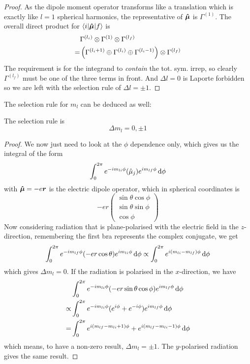 \begin{proof}
	As the dipole moment operator transforms like a translation which is exactly like $l=1$ spherical harmonics, the representative of $\boldsymbol{\hat{\mu}}$ is $\Gamma^{(1)} $. The overall direct product for $\langle i | \boldsymbol{\hat{\mu}}|f \rangle $ is 
	\begin{equation}
	\begin{aligned}
		&\Gamma^{(l_i)}\otimes\Gamma^{(1)}\otimes\Gamma^{(l_f)}\\
		=&\left(\Gamma^{(l_i+1)}\oplus\Gamma^{(l_i)}\oplus\Gamma^{(l_i-1)} \right)\otimes\Gamma^{(l_f)}
	\end{aligned}
	\end{equation}
	The requirement is for the integrand to \emph{contain} the tot. sym. irrep, so clearly $\Gamma^{(l_f)}$ must be one of the three terms in front. And $\Delta l=0$ is Laporte forbidden so we are left with the selection rule of $\Delta l=\pm1$.
\end{proof}
The selection rule for $m_l$ can be deduced as well:
\begin{thrm}
The selection rule is
\begin{equation}
	\Delta m_l=0,\pm1
\end{equation}
\end{thrm}
\begin{proof}
	 We now just need to look at the $\phi$ dependence only, which gives us the integral of the form
\begin{equation}
	\int^{2\pi}_0e^{-im_{li}\phi}(\hat{\mu}_j)e^{im_{lf}\phi}\dif \phi
\end{equation}
with $\boldsymbol{\hat{\mu}}=-e\boldsymbol{r}$ is the electric dipole operator, which in spherical coordinates is
\begin{equation}
	-er
	\begin{pmatrix}
		\sin\theta\cos\phi\\
		\sin\theta\sin\phi\\
		\cos\phi
	\end{pmatrix}
\end{equation}
Now considering radiation that is plane-polarised with the electric field in the $z$-direction, remembering the first bra represents the complex conjugate, we get
\begin{equation}
	\int^{2\pi}_0e^{-im_{lf}\phi}(-er\cos\theta)e^{im_{li}\phi}\dif \phi\propto\int^{2\pi}_0e^{i(m_{li}-m_{lf})\phi}\dif \phi
\end{equation}
which gives $\Delta m_l=0$. If the radiation is polarised in the $x$-direction, we have
\begin{equation}
\begin{aligned}
	&\int^{2\pi}_0e^{-im_{li}\phi}(-er\sin\theta\cos\phi)e^{im_{lf}\phi}\dif \phi\\
	\propto&\int^{2\pi}_0e^{-im_{li}\phi}(e^{i\phi}+e^{-i\phi})e^{im_{lf}\phi}\dif \phi\\
	=&\int^{2\pi}_0e^{i(m_{lf}-m_{li}+1)\phi}+e^{i(m_{lf}-m_{li}-1)\phi}\dif \phi
\end{aligned}
\end{equation}
which means, to have a non-zero result, $\Delta m_l=\pm1$. The $y$-polarised radiation gives the same result.
\end{proof}
